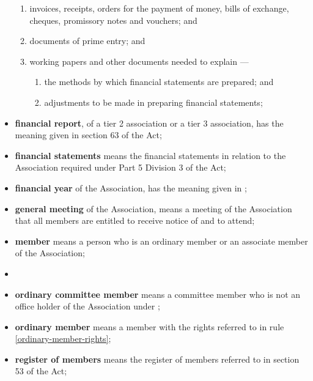 \documentclass[../constitution.tex]{subfiles}
\begin{document}
\begin{itemize}[label={-}]
\begin{enumerate}
  \item invoices, receipts, orders for the payment of money, bills of exchange, cheques, promissory notes and vouchers; and
  \item documents of prime entry; and
  \item working papers and other documents needed to explain ---
    \begin{enumerate}
    \def\labelenumi{\roman{enumi})}
    \setcounter{enumi}{0}
    \item the methods by which financial statements are prepared; and
    \item adjustments to be made in preparing financial statements; 
    \end{enumerate}
  \end{enumerate}
\item \textbf{financial report}, of a tier 2 association or a tier 3 association, has the meaning given in section 63 of the Act;
\item \textbf{financial statements} means the financial statements in relation to the Association required under Part 5 Division 3 of the Act;
\item \textbf{financial year}\chadded[id=proofing]{,} of the Association, has the meaning given in ;
\item \textbf{general meeting}\chadded[id=proofing]{,} of the Association, means a meeting of the Association that all members are entitled to receive notice of and to attend;
\item \textbf{member} means a person  who is an ordinary member or an associate member of the Association;
\item \textbf{} 
\item \textbf{ordinary committee member} means a committee member who is not an office holder of the Association under ;
\item \textbf{ordinary member} means a member with the rights referred to in rule \ref{ordinary-member-rights};
\item \textbf{register of members} means the register of members referred to in section 53 of the Act;

\end{itemize}
\end{document}

